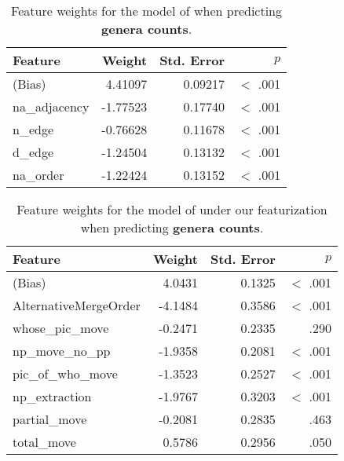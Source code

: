 \documentclass[11pt]{article}
\newcommand{\lt}{<}
\begin{document}
\begin{table}[ht!]
  \centering
  \begin{tabular}{|l|r|r|r|}
    \hline
    Feature & Weight & Std. Error & $p$ \\
    \hline
    (Bias)      & 4.41097 &    0.09217 &  $\lt$ .001 \\
    na\_adjacency & -1.77523 &    0.17740 &  $\lt$ .001 \\
    n\_edge       & -0.76628 &    0.11678 & $\lt$ .001 \\
    d\_edge       & -1.24504 &    0.13132 &  $\lt$ .001 \\
    na\_order     & -1.22424 &    0.13152 &  $\lt$ .001 \\
    \hline
  \end{tabular}
  \caption{Feature weights for the model of \citet{cysouw2010dealing} when predicting \textbf{genera counts}.}
\end{table}

\begin{table}[ht!]
  \centering
  \begin{tabular}{|l|r|r|r|}
    \hline
    Feature & Weight & Std. Error & $p$ \\
    \hline
    (Bias)                & 4.0431 &     0.1325 & $\lt$ .001\\
    AlternativeMergeOrder & -4.1484 &     0.3586 & $\lt$ .001\\
    whose\_pic\_move        & -0.2471 &     0.2335 & .290 \\
    np\_move\_no\_pp         & -1.9358 &     0.2081 & $\lt$ .001\\
    pic\_of\_who\_move       & -1.3523 &     0.2527 & $\lt$ .001\\
    np\_extraction         & -1.9767 &     0.3203 & $\lt$ .001\\
    partial\_move          & -0.2081 &     0.2835 &   .463 \\
    total\_move            &  0.5786 &    0.2956  &  .050 \\
    \hline
  \end{tabular}
  \caption{Feature weights for the model of \citet{cinque2005deriving} under our featurization when predicting \textbf{genera counts}.}
\end{table}
\end{document}
